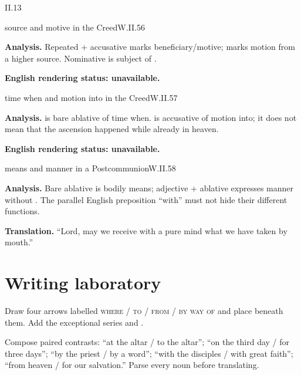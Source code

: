 \begin{courseunit}{II.13}
\begin{workedexample}{source and motive in the Creed}{W.II.56}

\textbf{Analysis.}  Repeated  + accusative marks beneficiary/motive;
 marks motion from a higher source.  Nominative  is subject of
.

\textbf{English rendering status: unavailable.}
\end{workedexample}

\begin{workedexample}{time when and motion into in the Creed}{W.II.57}

\textbf{Analysis.}   is bare ablative of time when.   is
accusative of motion into; it does not mean that the ascension happened while already in
heaven.

\textbf{English rendering status: unavailable.}
\end{workedexample}

\begin{workedexample}{means and manner in a Postcommunion}{W.II.58}

\textbf{Analysis.}  Bare ablative  is bodily means; adjective + ablative
 expresses manner without .  The parallel English preposition
``with'' must not hide their different functions.

\textbf{Translation.}  ``Lord, may we receive with a pure mind what we have taken by mouth.''
\end{workedexample}

\section{Writing laboratory}

Draw four arrows labelled \textsc{where / to / from / by way of} and place
 beneath them.  Add the exceptional
series  and .

Compose paired contrasts: ``at the altar / to the altar''; ``on the third day / for three
days''; ``by the priest / by a word''; ``with the disciples / with great faith''; ``from
heaven / for our salvation.''  Parse every noun before translating.



\end{courseunit}

